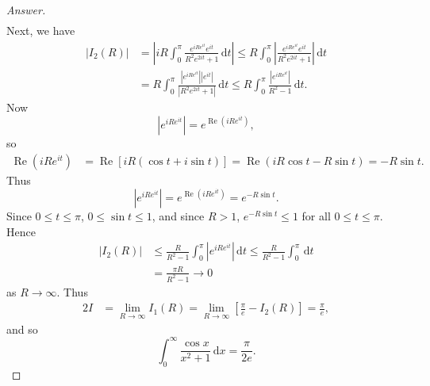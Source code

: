 \documentclass[12pt]{article}
\newcommand\paren[1]{\left( #1 \right)}
\newcommand{\sqbrack}[1]{\left [ #1 \right ]}
\theoremstyle{definition}
\DeclareMathOperator\re{Re}
\begin{document}
\begin{proof}[Answer]
\begin{align*}
    \end{align*}
    Next, we have
    \begin{align*}
        \left| I_2(R) \right| & = \left| iR \int_0^{\pi} \frac{e^{iRe^{it}}e^{it}}{R^2e^{2it}+1} \, \mathrm{d}t \right| \leq R \int_0^{\pi} \left| \frac{e^{iRe^{it}}e^{it}}{R^2e^{2it}+1} \right| \, \mathrm{d}t \\
        & = R \int_0^{\pi}  \frac{ \left| e^{iRe^{it}} \right| \left| e^{it} \right|}{\left| R^2e^{2it}+1 \right|}  \, \mathrm{d}t \leq R \int_0^{\pi}  \frac{ \left| e^{iRe^{it}} \right| }{R^2 -1 }  \, \mathrm{d}t.
    \end{align*}
    Now
    \[
        \left| e^{iRe^{it}} \right| = e^{ \re \paren{ iRe^{it} } },
    \]
    so 
    \begin{align*}
        \re \paren{ iRe^{it} } & = \re \sqbrack{ iR \paren{ \cos t + i \sin t } } = \re \paren{ iR \cos t - R \sin t } = -R \sin t.
    \end{align*}
    Thus 
    \[
        \left| e^{iRe^{it}} \right| = e^{ \re \paren{ iRe^{it} } } = e^{ -R \sin t }.
    \]
    Since $0 \leq t \leq \pi$, $0 \leq \sin t \leq 1$, and since $R > 1$, $e^{-R \sin t} \leq 1$ for all $0 \leq t \leq \pi$. Hence
    \begin{align*}
        \left| I_2(R) \right| & \leq \frac{R}{R^2 - 1} \int_0^{\pi} \left| e^{iRe^{it}} \right| \, \mathrm{d}t \leq \frac{R}{R^2 - 1} \int_0^{\pi} \, \mathrm{d}t \\
        & = \frac{\pi R}{R^2 - 1} \to 0
    \end{align*}
    as $R \to \infty$. Thus
    \begin{align*}
        2I & = \lim\limits_{R \to \infty} I_1(R) = \lim\limits_{R \to \infty} \sqbrack{ \frac{\pi}{e} - I_2(R) } = \frac{\pi}{e},
    \end{align*}
    and so 
    \[
        \int_{0}^{\infty} \frac{\cos x}{x^2 + 1} \, \mathrm{d}x = \boxed{ \frac{\pi}{2e} . }
    \]
\end{proof}
\end{document}
